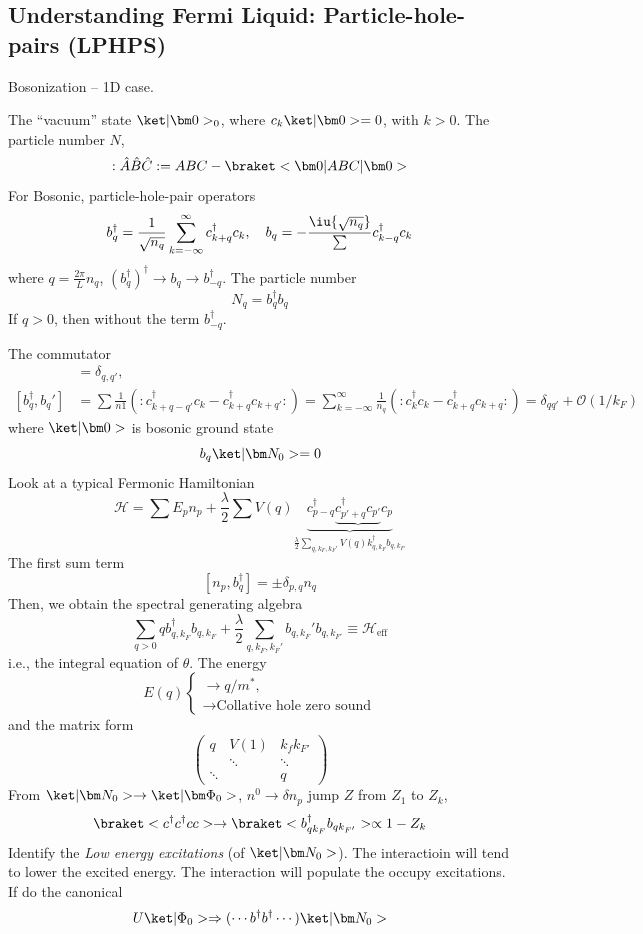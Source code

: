 \subsection{Understanding Fermi Liquid: Particle-hole-pairs (LPHPS)}

Bosonization -- 1D case.

The ``vacuum'' state $\ket|\bm 0>_0$, where $c_k\ket|\bm 0> = 0$, with $k > 0$.
The particle number $N$,
\[:\hat A\hat B\hat C: = ABC - \braket<\bm0|ABC|\bm0>\]
For Bosonic, particle-hole-pair operators
\[
  b_q^\dagger = \frac1{\sqrt{n_q}} \sum_{k=-\infty}^\infty c_{k+q}^\dagger c_k,
  \quad b_q = -\frac\iu{\sqrt{n_q}} \sum c_{k-q}^\dagger c_k
\]
where $q = \frac{2\pi}{L} n_q$,
$(b_q^\dagger)^\dagger \to b_q \to b_{-q}^\dagger$.
The particle number
\[
  N_q = b_q^\dagger b_q
\]
If $q > 0$, then without the term $b_{-q}^\dagger$.

The commutator
\begin{align*}
  [b_q, b_{q'}] & = \delta_{q,q'},\\
  [b_q^\dagger, b_q'] & = \sum\frac1{n1}
  (:c_{k+q-q'}^\dagger c_k - c_{k+q}^\dagger c_{k+q'}:)
= \sum_{k=-\infty}^\infty \frac1{n_q}
  (:c_k^\dagger c_k - c_{k+q}^\dagger c_{k+q}:)
= \delta_{qq'} + \mathcal O(1/k_F)
\end{align*}
where $\ket|\bm 0>$ is bosonic ground state
\[
  b_q \ket|\bm N_0> = 0
\]
Look at a typical Fermonic Hamiltonian
\begin{equation}
  \mathcal H = \sum E_p n_p
+ \frac\lambda2 \sum V(q)
  \underbrace{c_{p-q}^\dagger \underbrace{c_{p'+q}^\dagger c_{p'}} c_p}_
  {\frac\lambda2 \sum_{q,k_F,k_F'}V(q)k_{q,k_F}^\dagger b_{q,k_{F'}}}
\end{equation}
The first sum term
\[
  [n_p, b_q^\dagger] = \pm \delta_{p,q} n_q
\]
Then, we obtain the spectral generating algebra
\[
  \sum_{q>0} q b_{q,k_F}^\dagger b_{q,k_F}
+ \frac\lambda2 \sum_{q,k_F,k_F'} b_{q,k_F}' b_{q,k_{F'}}
\equiv \mathcal H_\text{eff}
\]
i.e., the integral equation of $\theta$. The energy
\[
  E(q) \begin{cases}
    \to q/m^*,\\\to \text{Collative hole zero sound}
  \end{cases}
\]
and the matrix form
\[
  \begin{pmatrix}
    q & V(1) & k_fk_{F'}\\
      & \ddots & \ddots \\
    \ddots & & q
  \end{pmatrix}
\]
From $\ket|\bm N_0> \to \ket|\bm\Phi_0>$, $n^0 \to \delta n_p$
jump $Z$ from $Z_1$ to $Z_k$,
\[
  \braket<c^\dagger c^\dagger cc> \to \braket<b_{qk_F}^\dagger b_{qk_{F'}}>
  \propto 1 - Z_k
\]
Identify the \emph{Low energy excitations} (of $\ket|\bm N_0>$).
The interactioin will tend to lower the excited energy.
The interaction will populate the occupy excitations.
If do the canonical
\[
  U\ket|\Phi_0> \Rightarrow (\cdots b^\dagger b^\dagger \cdots) \ket|\bm N_0>
\]